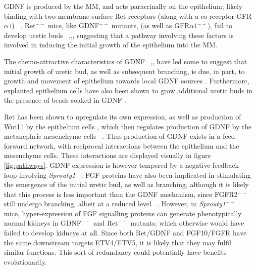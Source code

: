 \documentclass[pdftex,10pt,a4paper,twocolumn]{article}
\begin{document}
GDNF is produced by the MM, and acts paracrinally on the epithelium; likely binding with two membrane surface Ret receptors (along with a co-receptor GFR$\alpha 1$) ~\cite{MenshykauDIber}. Ret$^{--}$ mice, like GDNF$^{--}$ mutants, (as well as GFR$\alpha 1$$^{--}$), fail to develop uretic buds ~\cite{CostantiniFKopan2010},\cite{majumdar2003wnt11},\cite{treanor1996characterization}, suggesting that a pathway involving these factors is involved in inducing the initial growth of the epithelium into the MM.

The chemo-attractive characteristics of GDNF ~\cite{tang2002ureteric},\cite{tang1998ret}, have led some to suggest that initial growth of uretic bud, as well as subsequent branching, is due, in part, to growth and movement of epithelium towards local GDNF sources \cite{sariola2003novel}. Furthermore, explanted epithelium cells have also been shown to grow additional uretic buds in the presence of beads soaked in GDNF \cite{pepicelli1997gdnf}. 

Ret has been shown to upregulate its own expression, as well as production of Wnt11 by the epithelium cells \cite{pepicelli1997gdnf}, which then regulates production of GDNF by the metanephric mesenchyme cells ~\cite{majumdar2003wnt11}. Thus production of GDNF exists in a feed-forward network, with reciprocal interactions between the epithelium and the mesenchyme cells. These interactions are displayed visually in figure \ref{fig:pathways}. GDNF expression is however tempered by a negative feedback loop involving \textit{Sprouty1} ~\cite{basson2005sprouty1}. FGF proteins have also been implicated in stimulating the emergence of the initial uretic bud, as well as branching, although it is likely that this process is less important than the GDNF mechanism, since FGFR2${^{--}}$ still undergo branching, albeit at a reduced level ~\cite{sims2009three}. However, in \textit{Sprouty1}${^{--}}$ mice, hyper-expression of FGF signalling proteins can generate phenotypically normal kidneys in GDNF$^{--}$ and Ret$^{--}$ mutants; which otherwise would have failed to develop kidneys at all. Since both Ret/GDNF and FGF10/FGFR have the same downstream targets ETV4/ETV5, it is likely that they may fulfil similar functions. This sort of redundancy could potentially have benefits evolutionarily.
\end{document}
